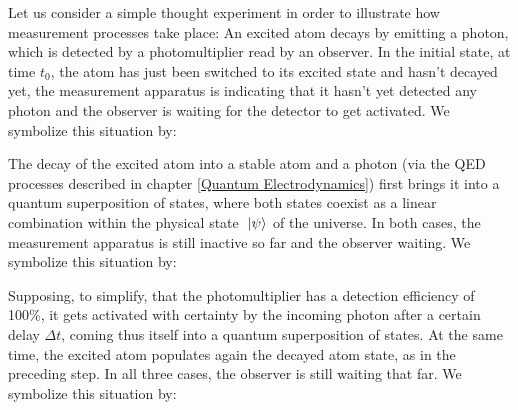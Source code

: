 \documentclass[10pt,a4paper,twoside,openany]{book}
\begin{document}
Let us consider a simple thought experiment in order to illustrate how measurement processes take place: An excited atom decays by emitting a photon, which is detected by a photomultiplier read by an observer. In the initial state, at time $t_0$, the atom has just been switched to its excited state and hasn't decayed yet, the measurement apparatus is indicating that it hasn't yet detected any photon and the observer is waiting for the detector to get activated. We symbolize this situation by:
\begin{flushleft}
\ExcitedAtom\hspace*{3mm}\DetectorOff\hspace*{3mm}\ObserverOff
\end{flushleft}
The decay of the excited atom into a stable atom and a photon (via the QED processes described in chapter \ref{Quantum Electrodynamics}) first brings it into a quantum superposition of states, where both states coexist as a linear combination within the physical state $\ \left|{\psi}\right\rangle$ of the universe. In both cases, the measurement apparatus is still inactive so far and the observer waiting. We symbolize this situation by:
\begin{flushleft}
\ExcitedAtom\hspace*{3mm}\DetectorOff\hspace*{3mm}\ObserverOff
\hspace*{3mm}\Superposition\hspace*{3mm}
\Atom\hspace*{3mm}\Photon\hspace*{3mm}\DetectorOff\hspace*{3mm}\ObserverOff
\end{flushleft}
Supposing, to simplify, that the photomultiplier has a detection efficiency of 100\%, it gets activated with certainty by the incoming photon after a certain delay $\Delta t$, coming thus itself into a quantum superposition of states. At the same time, the excited atom populates again the decayed atom state, as in the preceding step. In all three cases, the observer is still waiting that far. We symbolize this situation by:
\begin{flushleft}
\ExcitedAtom\hspace*{3mm}\DetectorOff\hspace*{3mm}\ObserverOff
\hspace*{3mm}\Superposition\hspace*{3mm}
\Atom\hspace*{3mm}\Photon\hspace*{3mm}\DetectorOff\hspace*{3mm}\ObserverOff
\hspace*{3mm}\Superposition\hspace*{3mm}
\Atom\hspace*{3mm}\DetectorOn\hspace*{3mm}\ObserverOff
\end{flushleft}
\end{document}
